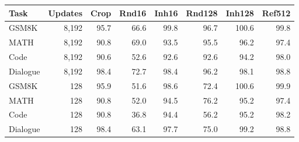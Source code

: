 \begin{tabular}{lrrrrrrr}
\toprule
Task & Updates & Crop & Rnd16 & Inh16 & Rnd128 & Inh128 & Ref512 \\
\midrule
GSM8K & 8,192 & 95.7 & 66.6 & 99.8 & 96.7 & 100.6 & 99.8 \\
MATH & 8,192 & 90.8 & 69.0 & 93.5 & 95.5 & 96.2 & 97.4 \\
Code & 8,192 & 90.6 & 52.6 & 92.6 & 92.6 & 94.2 & 98.0 \\
Dialogue & 8,192 & 98.4 & 72.7 & 98.4 & 96.2 & 98.1 & 98.8 \\
\midrule
GSM8K & 128 & 95.9 & 51.6 & 98.6 & 72.4 & 100.6 & 99.9 \\
MATH & 128 & 90.8 & 52.0 & 94.5 & 76.2 & 95.2 & 97.4 \\
Code & 128 & 90.8 & 36.8 & 94.4 & 56.2 & 95.2 & 98.2 \\
Dialogue & 128 & 98.4 & 63.1 & 97.7 & 75.0 & 99.2 & 98.8 \\
\bottomrule
\end{tabular}
